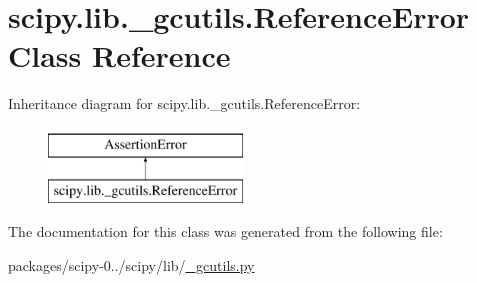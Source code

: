 \hypertarget{classscipy_1_1lib_1_1__gcutils_1_1ReferenceError}{}\section{scipy.\+lib.\+\_\+gcutils.\+Reference\+Error Class Reference}
\label{classscipy_1_1lib_1_1__gcutils_1_1ReferenceError}
Inheritance diagram for scipy.\+lib.\+\_\+gcutils.\+Reference\+Error\+:\begin{figure}[H]
\begin{center}
\leavevmode
\includegraphics[height=2.000000cm]{classscipy_1_1lib_1_1__gcutils_1_1ReferenceError}
\end{center}
\end{figure}


The documentation for this class was generated from the following file\+:\begin{DoxyCompactItemize}
\item 
packages/scipy-\/0../scipy/lib/\hyperlink{__gcutils_8py}{\+\_\+gcutils.\+py}\end{DoxyCompactItemize}
